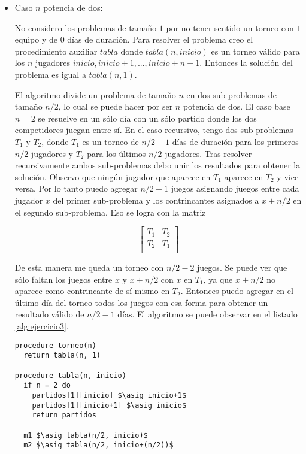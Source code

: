 \documentclass{article}
\newcommand{\asig}{\ensuremath{\leftarrow}}
\begin{document}
\begin{itemize}

\item Caso $n$ potencia de dos:

No considero los problemas de tamaño $1$ por no tener sentido un torneo con $1$ equipo y de $0$
días de duración. Para resolver el problema creo el procedimiento auxiliar $tabla$ donde
$tabla(n, inicio)$ es un torneo válido para los $n$ jugadores $inicio, inicio+1, ..., inicio+n-1$.
Entonces la solución del problema es igual a $tabla(n, 1)$.

El algoritmo divide un problema de tamaño $n$ en dos sub-problemas
de tamaño $n/2$, lo cual se puede hacer por ser $n$ potencia de dos. El caso base $n = 2$
se resuelve en un sólo día con un sólo partido donde los dos competidores juegan entre sí.
En el caso recursivo, tengo dos sub-problemas $T_1$ y $T_2$, donde $T_1$ es un torneo de $n/2-1$ días
de duración para los primeros $n/2$ jugadores y $T_2$ para los últimos $n/2$ jugadores. Tras resolver
recursivamente ambos sub-problemas debo unir los resultados para obtener la solución. Observo que ningún
jugador que aparece en $T_1$ aparece en $T_2$ y vice-versa. Por lo tanto puedo agregar $n/2-1$ juegos
asignando juegos entre cada jugador $x$ del primer sub-problema y los contrincantes asignados a $x+n/2$
en el segundo sub-problema. Eso se logra con la matriz

$$
\left[
\begin{array}{cc}
T_1 & T_2 \\
T_2 & T_1 \\
\end{array}
\right]
$$

De esta manera me queda un torneo con $n/2-2$ juegos. Se puede ver que sólo faltan los juegos
entre $x$ y $x+n/2$ con $x$ en $T_1$, ya que $x+n/2$ no aparece como contrincante de sí mismo
en $T_2$. Entonces puedo agregar en el último día del torneo todos los juegos con esa forma para
obtener un resultado válido de $n/2-1$ días. El algoritmo se puede observar en el listado
\ref{alg:ejercicio3}.

\begin{lstlisting}[float,caption={Solución al ejercicio 3},label=alg:ejercicio3]
procedure torneo(n)
  return tabla(n, 1)

procedure tabla(n, inicio)
  if n = 2 do
    partidos[1][inicio] $\asig inicio+1$
    partidos[1][inicio+1] $\asig inicio$
    return partidos

  m1 $\asig tabla(n/2, inicio)$
  m2 $\asig tabla(n/2, inicio+(n/2))$


\end{lstlisting}
\end{itemize}
\end{document}
